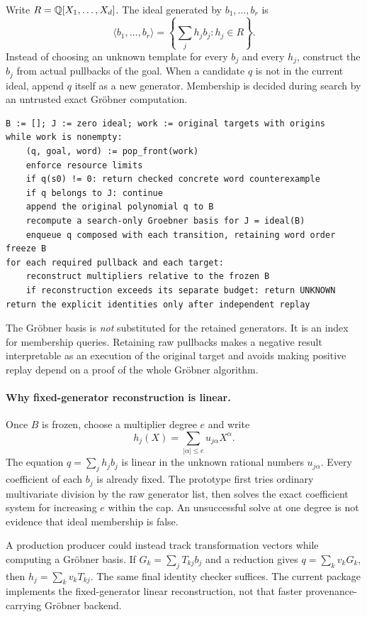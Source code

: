Write $R=\mathbb Q[X_1,\ldots,X_d]$. The ideal generated by $b_1,\ldots,b_r$ is
\[
 \langle b_1,\ldots,b_r\rangle
 =\left\{\sum_j h_jb_j:h_j\in R\right\}.
\]
Instead of choosing an unknown template for every $b_j$ and every $h_j$, construct the $b_j$ from actual pullbacks of the goal. When a candidate $q$ is not in the current ideal, append $q$ itself as a new generator. Membership is decided during search by an untrusted exact Gr\"obner computation.

\begin{lstlisting}
B := []; J := zero ideal; work := original targets with origins
while work is nonempty:
    (q, goal, word) := pop_front(work)
    enforce resource limits
    if q(s0) != 0: return checked concrete word counterexample
    if q belongs to J: continue
    append the original polynomial q to B
    recompute a search-only Groebner basis for J = ideal(B)
    enqueue q composed with each transition, retaining word order
freeze B
for each required pullback and each target:
    reconstruct multipliers relative to the frozen B
    if reconstruction exceeds its separate budget: return UNKNOWN
return the explicit identities only after independent replay
\end{lstlisting}

The Gr\"obner basis is \emph{not} substituted for the retained generators. It is an index for membership queries. Retaining raw pullbacks makes a negative result interpretable as an execution of the original target and avoids making positive replay depend on a proof of the whole Gr\"obner algorithm.

\paragraph{Why fixed-generator reconstruction is linear.}
Once $B$ is frozen, choose a multiplier degree $e$ and write
\[
 h_j(X)=\sum_{|\alpha|\le e}u_{j\alpha}X^\alpha.
\]
The equation $q=\sum_jh_jb_j$ is linear in the unknown rational numbers $u_{j\alpha}$. Every coefficient of each $b_j$ is already fixed. The prototype first tries ordinary multivariate division by the raw generator list, then solves the exact coefficient system for increasing $e$ within the cap. An unsuccessful solve at one degree is not evidence that ideal membership is false.

A production producer could instead track transformation vectors while computing a Gr\"obner basis. If $G_k=\sum_j T_{kj}b_j$ and a reduction gives $q=\sum_k v_kG_k$, then $h_j=\sum_kv_kT_{kj}$. The same final identity checker suffices. The current package implements the fixed-generator linear reconstruction, not that faster provenance-carrying Gr\"obner backend.

